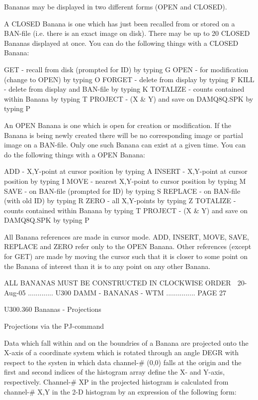    Bananas may be displayed in two different forms (OPEN and CLOSED).
 
   A  CLOSED  Banana  is  one which has just been recalled from or stored on a
   BAN-file (i.e. there is an exact image on disk). There  may  be  up  to  20
   CLOSED  Bananas  displayed  at once. You can do the following things with a
   CLOSED Banana:
 
   GET      -  recall from disk (prompted for ID)     by typing  G
   OPEN     -  for modification (change to OPEN)      by typing  O
   FORGET   -  delete from display                    by typing  F
   KILL     -  delete from display and BAN-file       by typing  K
   TOTALIZE -  counts contained within Banana         by typing  T
   PROJECT  -  (X & Y) and save on DAMQ8Q.SPK         by typing  P
 
   An OPEN Banana is one which is open for creation or  modification.  If  the
   Banana  is  being  newly  created  there  will be no corresponding image or
   partial image on a BAN-file. Only one such Banana  can  exist  at  a  given
   time. You can do the following things with a OPEN Banana:
 
   ADD      -  X,Y-point at cursor position           by typing  A
   INSERT   -  X,Y-point at cursor position           by typing  I
   MOVE     -  nearest X,Y-point to cursor position   by typing  M
   SAVE     -  on BAN-file (prompted for ID)          by typing  S
   REPLACE  -  on BAN-file (with old ID)              by typing  R
   ZERO     -  all X,Y-points                         by typing  Z
   TOTALIZE -  counts contained within Banana         by typing  T
   PROJECT  -  (X & Y) and save on DAMQ8Q.SPK         by typing  P
 
   All  Banana  references  are  made in cursor mode. ADD, INSERT, MOVE, SAVE,
   REPLACE and ZERO refer only to the OPEN Banana.  Other  references  (except
   for  GET)  are  made  by  moving  the cursor such that it is closer to some
   point on the Banana of interest than it  is  to  any  point  on  any  other
   Banana.
 
               ALL BANANAS MUST BE CONSTRUCTED IN CLOCKWISE ORDER
    
   20-Aug-05 ............. U300  DAMM - BANANAS - WTM ............... PAGE  27
 
   U300.360  Bananas - Projections
 
   Projections via the PJ-command
 
   Data  which fall within and on the boundries of a Banana are projected onto
   the X-axis of a coordinate system which is rotated through  an  angle  DEGR
   with  respect  to  the  systen  in  which data channel-# (0,0) falls at the
   origin and the first and second indices of the histogram array  define  the
   X-  and  Y-axis,  respectively.  Channel-# XP in the projected histogram is
   calculated from channel-# X,Y in the 2-D histogram by an expression of  the
   following form:
 
